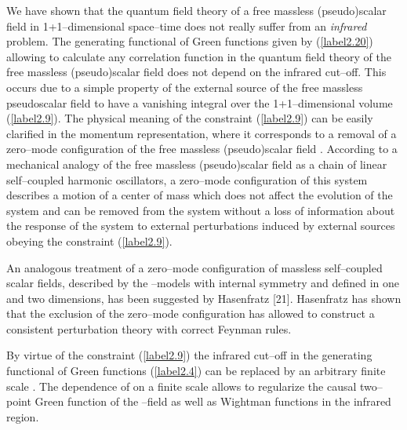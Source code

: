 \documentclass[a4paper,12pt] {article}
\begin{document}
\hspace{0.2in} We have shown that the quantum field theory of a free
massless (pseudo)scalar field in 1+1--dimensional space--time does not
really suffer from an {\it infrared} problem. The generating
functional of Green functions \coordHE{} given by (\ref{label2.20})
allowing to calculate any correlation function in the quantum field
theory of the free massless (pseudo)scalar field \coordHE{} does
not depend on the infrared cut--off. This occurs due to a simple
property of the external source of the free massless pseudoscalar
field to have a vanishing integral over the 1+1--dimensional volume
(\ref{label2.9}). The physical meaning of the constraint
(\ref{label2.9}) can be easily clarified in the momentum
representation, where it corresponds to a removal of a zero--mode
configuration of the free massless (pseudo)scalar field
\coordHE{}.  According to a mechanical analogy of the free
massless (pseudo)scalar field \coordHE{} as a chain of \coordHE{} linear
self--coupled harmonic oscillators, a zero--mode configuration of this
system describes a motion of a center of mass which does not affect
the evolution of the system and can be removed from the system without
a loss of information about the response of the system to external
perturbations induced by external sources obeying the constraint
(\ref{label2.9}).

An analogous treatment of a zero--mode configuration of massless
 self--coupled scalar fields, described by the \myHighlight{$\sigma$}\coordHE{}--models with
 internal \coordHE{} symmetry and defined in one and two dimensions, has
 been suggested by Hasenfratz [21]. Hasenfratz has shown that the
 exclusion of the zero--mode configuration has allowed to construct a
 consistent perturbation theory with correct Feynman rules.

By virtue of the constraint (\ref{label2.9}) the infrared cut--off
\myHighlight{$\mu$}\coordHE{} in the generating functional of Green functions (\ref{label2.4})
can be replaced by an arbitrary finite scale \coordHE{}. The dependence of
\coordHE{} on a finite scale \coordHE{} allows to regularize the causal
two--point Green function of the \myHighlight{$\vartheta$}\coordHE{}--field as well as
Wightman functions in the infrared region.
\end{document}
